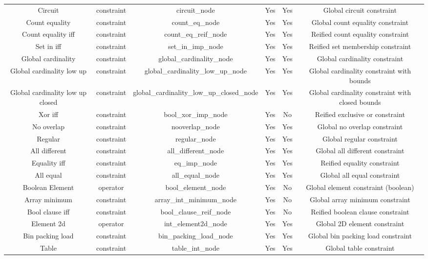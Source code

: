 \begin{table}
{\begin{tabular}{|c|c|c|c|c|c|}
 Circuit & constraint & circuit\_node & Yes & Yes & Global circuit constraint \\
 Count equality & constraint & count\_eq\_node & Yes & Yes & Global count equality constraint \\
 Count equality iff & constraint & count\_eq\_reif\_node & Yes & Yes & Reified count equality constraint \\
 Set in iff & constraint & set\_in\_imp\_node & Yes & Yes & Reified set membership constraint \\
 Global cardinality & constraint & global\_cardinality\_node & Yes & Yes & Global cardinality constraint \\
 Global cardinality low up & constraint & global\_cardinality\_low\_up\_node & Yes & Yes & Global cardinality constraint with bounds \\
 Global cardinality low up closed & constraint & global\_cardinality\_low\_up\_closed\_node & Yes & Yes & Global cardinality constraint with closed bounds \\
 Xor iff & constraint & bool\_xor\_imp\_node & Yes & No & Reified exclusive or constraint \\
 No overlap & constraint & nooverlap\_node & Yes & Yes & Global no overlap constraint \\
 Regular & constraint & regular\_node & Yes & Yes & Global regular constraint \\
 All different & constraint & all\_different\_node & Yes & Yes & Global all different constraint \\
 Equality iff & constraint & eq\_imp\_node & Yes & Yes & Reified equality constraint \\
 All equal & constraint & all\_equal\_node & Yes & Yes & Global all equal constraint \\
 Boolean Element & operator & bool\_element\_node & Yes & No & Global element constraint (boolean) \\
 Array minimum & constraint & array\_int\_minimum\_node & Yes & No & Global array minimum constraint \\
 Bool clause iff & constraint & bool\_clause\_reif\_node & Yes & No & Reified boolean clause constraint \\
 Element 2d & operator & int\_element2d\_node & Yes & Yes & Global 2D element constraint \\
 Bin packing load & constraint & bin\_packing\_load\_node & Yes & Yes & Global bin packing load constraint \\
 Table & constraint & table\_int\_node & Yes & Yes & Global table constraint \\

\end{tabular}}
\end{table}

